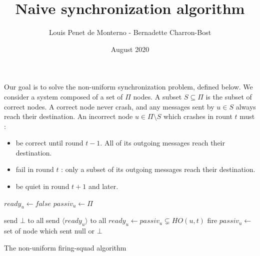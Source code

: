 \documentclass{article}
\title{Naive synchronization algorithm}
\date{August 2020}
\author{Louis Penet de Monterno - Bernadette Charron-Bost}
\begin{document}
Our goal is to solve the non-uniform synchronization problem, defined below.
We consider a system composed of a set of $\Pi$ nodes.
A subset $S \subseteq \Pi$ is the subset of correct nodes.
A correct node never crash, and any messages sent by $u \in S$ always reach their destination.
An incorrect node $u \in \Pi \setminus S$ which crashes in rount $t$ must :
\begin{itemize}
	\item be correct until round $t-1$. All of its outgoing messages reach their destination.
	\item fail in round $t$ : only a subset of its outgoing messages reach their destination.
	\item be quiet in round $t+1$ and later.
\end{itemize}



\begin{algorithm}[htb]\label{algo:code}
\begin{distribalgo}[1]
\BLANK {}
	\STATE $ready_u \leftarrow false$
	\STATE $passiv_u \leftarrow \Pi$

\ENDINDENT \BLANK

			\STATE send $\bot$ to all
		\ELSE
			\STATE send $\langle ready_u \rangle$ to all
		\ENDIF
	\ENDINDENT \BLANK
		\STATE $ready_u \leftarrow passiv_u \subsetneq HO(u, t)$
			\STATE fire 
		\ENDIF
		\STATE $passiv_u \leftarrow $ set of node which sent null or $\bot$
	\ENDINDENT 
\ENDINDENT 

\caption{The non-uniform firing-squad algorithm} \label{algo:R}
\end{distribalgo}

\end{algorithm}
\end{document}

